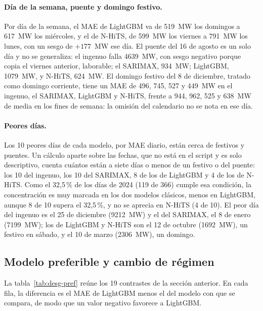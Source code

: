 \paragraph{Día de la semana, puente y domingo festivo.} Por día de la semana, el
MAE de LightGBM va de 519~MW los domingos a 617~MW los miércoles, y el de N-HiTS,
de 599~MW los viernes a 791~MW los lunes, con un sesgo de $+177$~MW ese día. El
puente del 16 de agosto es un solo día y no se generaliza: el ingenuo falla
4639~MW, con sesgo negativo porque copia el viernes anterior, laborable;
el SARIMAX, 934~MW; LightGBM, 1079~MW, y N-HiTS, 624~MW. El domingo festivo del
8 de diciembre, tratado como domingo corriente, tiene un MAE de 496, 745, 527 y
449~MW en el ingenuo, el SARIMAX, LightGBM y N-HiTS, frente a 944, 962, 525 y
638~MW de media en los fines de semana: la omisión del calendario no se nota en
ese día.

\paragraph{Peores días.} Los 10 peores días de cada modelo, por MAE diario,
están cerca de festivos y puentes. Un cálculo aparte sobre las fechas, que no
está en el script y es solo descriptivo, cuenta cuántos están a siete días o
menos de un festivo o del puente: los 10 del ingenuo, los 10 del SARIMAX, 8 de
los de LightGBM y 4 de los de N-HiTS. Como el 32,5\,\% de los días de 2024 (119
de 366) cumple esa condición, la concentración es muy marcada en los dos modelos
clásicos, menos en LightGBM, aunque 8 de 10 supera el 32,5\,\%, y no se aprecia en N-HiTS (4 de 10). El peor día del ingenuo
es el 25 de diciembre (9212~MW) y el del SARIMAX, el 8 de enero (7199~MW); los
de LightGBM y N-HiTS son el 12 de octubre (1692~MW), un festivo en sábado, y el
10 de marzo (2306~MW), un domingo.

\subsection{Modelo preferible y cambio de régimen}\label{sec:desg-regimen}

La tabla~\ref{tab:desg-pref} reúne los 19 contrastes de la sección anterior. En
cada fila, la diferencia es el MAE de LightGBM menos el del modelo con que se
compara, de modo que un valor negativo favorece a LightGBM.

